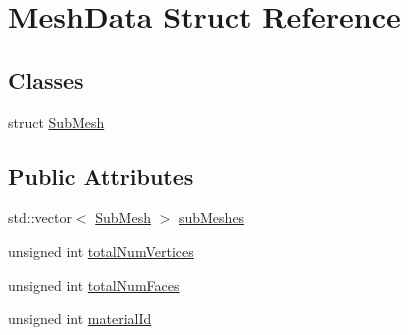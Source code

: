 \hypertarget{structMeshData}{\section{Mesh\-Data Struct Reference}
\label{structMeshData}
}
\subsection*{Classes}
\begin{DoxyCompactItemize}
\item 
struct \hyperlink{structMeshData_1_1SubMesh}{Sub\-Mesh}
\end{DoxyCompactItemize}
\subsection*{Public Attributes}
\begin{DoxyCompactItemize}
\item 
std\-::vector$<$ \hyperlink{structMeshData_1_1SubMesh}{Sub\-Mesh} $>$ \hyperlink{structMeshData_ad53c530da08754f9ff255ba6250fe8fa}{sub\-Meshes}
\item 
unsigned int \hyperlink{structMeshData_ac7c4051c8815101f259ad87b9c332031}{total\-Num\-Vertices}
\item 
unsigned int \hyperlink{structMeshData_a299cb84c5c2cc5311c41f855578862da}{total\-Num\-Faces}
\item 
unsigned int \hyperlink{structMeshData_afa7dbd31d33ae296a3d64f23f79ba813}{material\-Id}
\end{DoxyCompactItemize}


